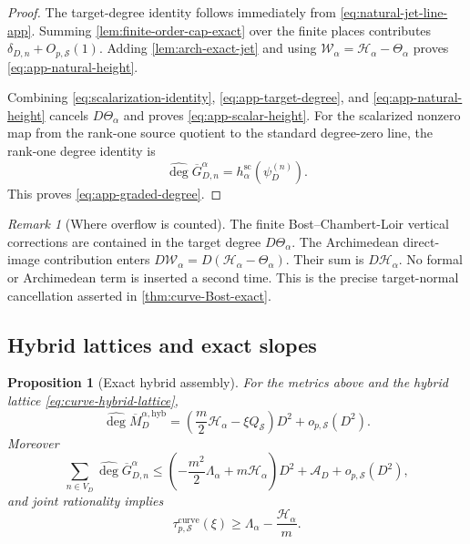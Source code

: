 \documentclass[11pt]{article}
\newtheorem{proposition}[proposition]{Proposition}
\theoremstyle{definition}
\theoremstyle{remark}
\newtheorem{remark}[remark]{Remark}
\newcommand{\widehatdeg}{\widehat{\deg}}
\newcommand{\Energy}{\mathscr H}
\newcommand{\LambdaAH}{\Lambda}
\begin{document}
\begin{proof}
The target-degree identity follows immediately from
\eqref{eq:natural-jet-line-app}.  Summing
\cref{lem:finite-order-cap-exact} over the finite places contributes
$\delta_{D,n}+O_{p,\mathcal S}(1)$.  Adding
\cref{lem:arch-exact-jet} and using
$\mathscr W_\alpha=\Energy_\alpha-\Theta_\alpha$ proves
\eqref{eq:app-natural-height}.

Combining \eqref{eq:scalarization-identity},
\eqref{eq:app-target-degree}, and \eqref{eq:app-natural-height} cancels
$D\Theta_\alpha$ and proves \eqref{eq:app-scalar-height}.  For the scalarized
nonzero map from the rank-one source quotient to the standard degree-zero
line, the rank-one degree identity is
\[
 \widehatdeg\overline G_{D,n}^\alpha
 =h_\alpha^{\mathrm{sc}}(\psi_D^{(n)}).
\]
This proves \eqref{eq:app-graded-degree}.
\end{proof}

\begin{remark}[Where overflow is counted]
The finite Bost--Chambert-Loir vertical corrections are contained in the target
degree $D\Theta_\alpha$.  The Archimedean direct-image contribution enters
$D\mathscr W_\alpha=D(\Energy_\alpha-\Theta_\alpha)$.  Their sum is
$D\Energy_\alpha$.  No formal or Archimedean term is inserted a second time.
This is the precise target-normal cancellation asserted in
\cref{thm:curve-Bost-exact}.
\end{remark}

\subsection{Hybrid lattices and exact slopes}

\begin{proposition}[Exact hybrid assembly]
\label{prop:exact-hybrid-assembly}
For the metrics above and the hybrid lattice
\eqref{eq:curve-hybrid-lattice},
\begin{equation}\label{eq:app-exact-hybrid}
 \widehatdeg\overline M_D^{\alpha,\mathrm{hyb}}
 =\left(\frac m2\Energy_\alpha-\xi Q_{\mathcal S}\right)D^2
  +o_{p,\mathcal S}(D^2).
\end{equation}
Moreover
\begin{equation}\label{eq:app-exact-degree-sum}
 \sum_{n\in V_D}\widehatdeg\overline G_{D,n}^\alpha
 \le\left(-\frac{m^2}{2}\LambdaAH_\alpha
          +m\Energy_\alpha\right)D^2
    +\mathscr A_D+o_{p,\mathcal S}(D^2),
\end{equation}
and joint rationality implies
\begin{equation}\label{eq:app-exact-slopes}
 \tau^{\mathrm{curve}}_{p,\mathcal S}(\xi)
 \ge\LambdaAH_\alpha-\frac{\Energy_\alpha}{m}.
\end{equation}
\end{proposition}
\end{document}
